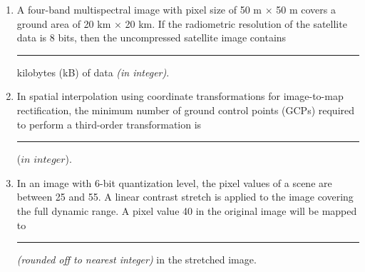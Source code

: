 \documentclass[12pt]{article}
\begin{document}
\begin{enumerate}
\item A four-band multispectral image with pixel size of 50 m × 50 m covers a ground
area of 20 km × 20 km. If the radiometric resolution of the satellite data is 8 bits,
then the uncompressed satellite image contains\rule{2cm}{0.15mm}  kilobytes (kB) of data \textit{(in integer)}.

\item In spatial interpolation using coordinate transformations for image-to-map
rectification, the minimum number of ground control points (GCPs) required to
perform a third-order transformation is \rule{2cm}{0.15mm}($in$ $integer$). 

\item In an image with 6-bit quantization level, the pixel values of a scene are between 25
and 55. A linear contrast stretch is applied to the image covering the full dynamic
range. A pixel value 40 in the original image will be mapped to \rule{2cm}{0.15mm} \textit{(rounded off to nearest integer)} in the stretched image.







\end{enumerate}
\end{document}
